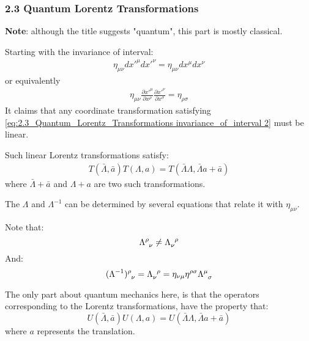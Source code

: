 \documentclass{article}
\numberwithin{equation}{subsection} %
\theoremstyle{definition}
\begin{document}
    \subsubsection{2.3 Quantum Lorentz Transformations}
    \label{sec:2.3_Quantum_Lorentz_Transformations}
    \textbf{Note}: although the title suggests "quantum", this part is
    mostly classical.

    Starting with the invariance of interval:
    \begin{align}
        \label{eq:2.3_Quantum_Lorentz_Transformations invariance_of_interval}
        \eta_{\mu\nu}dx'^\mu dx'^\nu = \eta_{\mu\nu}dx^\mu dx^\nu
    \end{align}
    or equivalently %
    \begin{align}
        \label{eq:2.3_Quantum_Lorentz_Transformations invariance_of_interval 2}
        \eta_{\mu\nu} \frac{\partial x'^\mu}{\partial x^\rho}
            \frac{\partial x'^\nu}{\partial x^\sigma}
            =
        \eta_{\rho\sigma}
    \end{align}
    It claims that any coordinate transformation satisfying 
    \ref{eq:2.3_Quantum_Lorentz_Transformations invariance_of_interval 2}
    must be linear.

    Such linear Lorentz transformations satisfy:
    \begin{align}
        T(\bar{\Lambda},\bar{a})T(\Lambda,a) = 
            T(\bar{\Lambda}\Lambda, \bar{\Lambda}a+\bar{a})
    \end{align}
    where $\bar{\Lambda}+\bar{a}$ and $\Lambda+a$ are two such 
    transformations.

    The $\Lambda$ and $\Lambda^{-1}$ can be determined by several 
    equations that relate it with $\eta_{\mu\nu}$. 
    
    Note that:
    \[ \Lambda\indices{^\rho_\nu} \neq \Lambda\indices{_\nu^\rho} \]
    And:
    \begin{equation}
        \label{eq:2.3_Quantum_Lorentz_Transformations transformation_matrix}
        (\Lambda^{-1})\indices{^\rho_\nu} = 
            \Lambda\indices{_\nu^\rho} = 
            \eta_{\nu\mu}\eta^{\rho\sigma} \Lambda\indices{^\mu_\sigma}
    \end{equation}

    The only part about quantum mechanics here, is that the operators
    corresponding to the Lorentz transformations, have the property that:
    \begin{equation}
        U(\bar\Lambda,\bar{a})U(\Lambda, a) = 
            U(\bar\Lambda\Lambda, \bar\Lambda a + \bar{a})
    \end{equation}
    where $a$ represents the translation.
    
\end{document}
